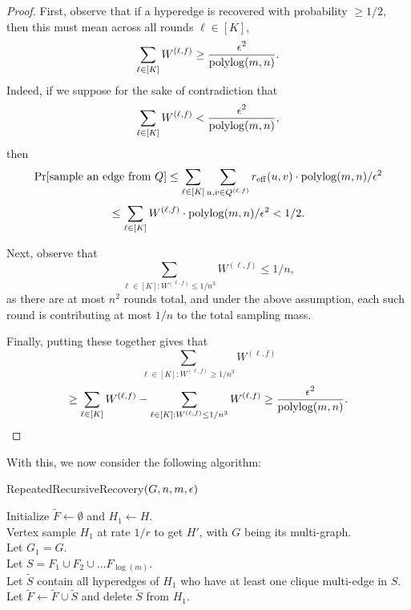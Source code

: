 \documentclass{article}
\begin{document}
\begin{proof}
    First, observe that if a hyperedge is recovered with probability $\geq 1/2$, then this must mean across all rounds $\ell \in [K]$, 
    \[
     \sum_{\ell \in [K]} W^{(\ell, f)} \geq \frac{\epsilon^2}{\operatorname{polylog}(m,n)}.
    \]
    Indeed, if we suppose for the sake of contradiction that 
    \[
    \sum_{\ell \in [K]} W^{(\ell, f)} < \frac{\epsilon^2}{\operatorname{polylog}(m,n)}, 
    \]
    then 
    \[
    \Pr[\text{sample an edge from } Q] \leq \sum_{\ell \in [K]} \sum_{u,v \in Q^{(\ell, f)}} r_{\mathrm{eff}}(u,v) \cdot \operatorname{polylog}(m,n) / \epsilon^2 
    \]
    \[
    \leq \sum_{\ell \in [K]} W^{(\ell, f)}  \cdot \operatorname{polylog}(m,n) / \epsilon^2 < 1/2.
    \]

    Next, observe that 
\[
    \sum_{\ell \in [K]: W^{(\ell, f)} \leq 1 / n^3} W^{(\ell, f)} \leq 1/n,
    \]
    as there are at most $n^2$ rounds total, and under the above assumption, each such round is contributing at most $1/ n$ to the total sampling mass. 

    Finally, putting these together gives that 
    \[
    \sum_{\ell \in [K]: W^{(\ell, f)} \geq 1 / n^3} W^{(\ell, f)} 
    \]
    \[
    \geq \sum_{\ell \in [K]} W^{(\ell, f)}  - \sum_{\ell \in [K]: W^{(\ell, f)} \leq 1 / n^3} W^{(\ell, f)} \geq \frac{\epsilon^2}{\operatorname{polylog}(m,n)}.
    \]
\end{proof}

With this, we now consider the following algorithm:

\begin{algorithm}[H]
    \caption{RepeatedRecursiveRecovery$(G, n, m, \epsilon)$}\label{alg:RepeatedIterativeRecovery}
    Initialize $\widetilde{F} \gets \emptyset$ and $H_1 \gets H$.\\
     {
    Vertex sample $H_1$ at rate $1/r$ to get $H'$, with $G$ being its multi-graph.\\ 
    Let $G_1 = G$. \\
    Let $S =  F_1 \cup F_2 \cup \dots F_{\log(m)}$.\\
    Let $\widetilde{S}$
    contain all hyperedges of $H_1$ who have at least one
    clique multi-edge in $S$. \\
    Let $\widetilde{F} \gets \widetilde{F} \cup \widetilde{S}$ and delete $\widetilde{S}$ from $H_1$.
    }
\end{algorithm}
\end{document}
